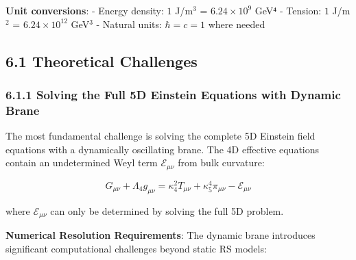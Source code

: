 \documentclass[
  11pt,
]{report}
\begin{document}
\textbf{Unit conversions}: - Energy density: \(1\) J/m\(^3\) =
\(6.24 \times 10^{9}\) GeV\(⁴\) - Tension: \(1\) J/m\(^2\) =
\(6.24 \times 10^{12}\) GeV\(^3\) - Natural units: \(\hbar = c = 1\)
where needed

\subsection{6.1 Theoretical Challenges}\label{theoretical-challenges}

\subsubsection{6.1.1 Solving the Full 5D Einstein Equations with Dynamic
Brane}\label{solving-the-full-5d-einstein-equations-with-dynamic-brane}

The most fundamental challenge is solving the complete 5D Einstein field
equations with a dynamically oscillating brane. The 4D effective
equations contain an undetermined Weyl term \(\mathcal{E}_{\mu\nu}\)
from bulk curvature:

\[G_{\mu\nu} + \Lambda_4 g_{\mu\nu} = \kappa_4^2 T_{\mu\nu} + \kappa_5^4 \pi_{\mu\nu} - \mathcal{E}_{\mu\nu}\]

where \(\mathcal{E}_{\mu\nu}\) can only be determined by solving the
full 5D problem.

\textbf{Numerical Resolution Requirements}: The dynamic brane introduces
significant computational challenges beyond static RS models:
\end{document}
